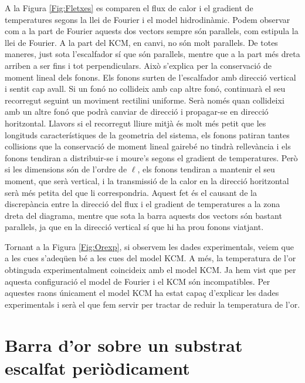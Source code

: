 \documentclass{article}
\begin{document}
A la Figura \ref{Fig:Fletxes} es comparen el flux de calor i el gradient de temperatures segons la llei de Fourier i el model hidrodin\`{a}mic. Podem observar com a la part de Fourier aquests dos vectors sempre s\'{o}n paral\textperiodcentered lels, com estipula la llei de Fourier. A la part del KCM, en canvi, no s\'{o}n molt paral\textperiodcentered lels. De totes maneres, just sota l'escalfador s\'{i} que s\'{o}n paral\textperiodcentered lels, mentre que a la part m\'{e}s dreta arriben a ser fins i tot perpendiculars. Aix\`{o} s'explica per la conservaci\'{o} de moment lineal dels fonons. Els fonons surten de l'escalfador amb direcci\'{o} vertical i sentit cap avall. Si un fon\'{o} no col\textperiodcentered lideix amb cap altre fon\'{o}, continuar\`{a} el seu recorregut seguint un moviment rectilini uniforme. Ser\`{a} nom\'{e}s quan col\textperiodcentered lideixi amb un altre fon\'{o} que podr\`{a} canviar de direcci\'{o} i propagar-se en direcci\'{o} horitzontal. Llavors si el recorregut lliure mitj\`{a} \'{e}s molt m\'{e}s petit que les longituds caracter\'{i}stiques de la geometria del sistema, els fonons patiran tantes col\textperiodcentered lisions que la conservaci\'{o} de moment lineal gaireb\'{e} no tindr\`{a} rellev\`{a}ncia i els fonons tendiran a distribuir-se i moure's segons el gradient de temperatures. Per\`{o} si les dimensions s\'{o}n de l'ordre de $\ell$, els fonons tendiran a mantenir el seu moment, que ser\`{a} vertical, i la transmissi\'{o} de la calor en la direcci\'{o} horitzontal ser\`{a} m\'{e}s petita del que li correspondria. Aquest fet \'{e}s el causant de la discrep\`{a}ncia entre la direcci\'{o} del flux i el gradient de temperatures a la zona dreta del diagrama, mentre que sota la barra aquests dos vectors s\'{o}n bastant paral\textperiodcentered lels, ja que en la direcci\'{o} vertical s\'{i} que hi ha prou fonons viatjant.

Tornant a la Figura \ref{Fig:Orexp}, si observem les dades experimentals, veiem que a les cues s'adeq\"{u}en b\'{e} a les cues del model KCM. A m\'{e}s, la temperatura de l'or obtinguda experimentalment coincideix amb el model KCM. Ja hem vist que per aquesta configuraci\'{o} el model de Fourier i el KCM s\'{o}n incompatibles. Per aquestes raons \'{u}nicament el model KCM ha estat capa\c{c} d'explicar les dades experimentals i ser\`{a} el que fem servir per tractar de reduir la temperatura de l'or.

\section{Barra d'or sobre un substrat escalfat peri\`{o}dicament}
\end{document}
